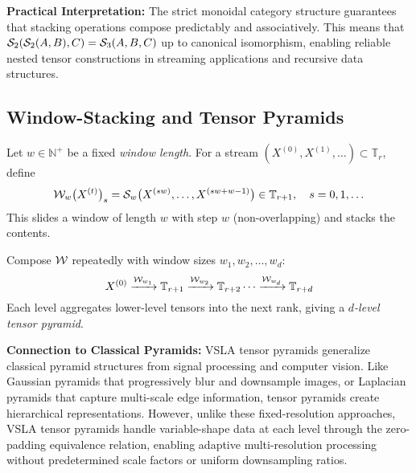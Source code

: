 \textbf{Practical Interpretation:} The strict monoidal category structure guarantees that stacking operations compose predictably and associatively. This means that $\mathcal{S}_2(\mathcal{S}_2(A,B),C) = \mathcal{S}_3(A,B,C)$ up to canonical isomorphism, enabling reliable nested tensor constructions in streaming applications and recursive data structures.

\subsection{Window-Stacking and Tensor Pyramids}

\begin{definition}
Let $w \in \mathbb{N}^+$ be a fixed \emph{window length}. For a stream $(X^{(0)}, X^{(1)}, \ldots) \subset \mathbb{T}_r$, define
\[
\mathcal{W}_w\bigl(X^{(t)}\bigr)_s = \mathcal{S}_w\bigl(X^{(sw)}, \ldots, X^{(sw+w-1)}\bigr) \in \mathbb{T}_{r+1}, \quad s = 0, 1, \ldots
\]
This slides a window of length $w$ with step $w$ (non-overlapping) and stacks the contents.
\end{definition}

\begin{definition}
Compose $\mathcal{W}$ repeatedly with window sizes $w_1, w_2, \ldots, w_d$:
\[
X^{(0)} \xrightarrow{\mathcal{W}_{w_1}} \mathbb{T}_{r+1} \xrightarrow{\mathcal{W}_{w_2}} \mathbb{T}_{r+2} \cdots \xrightarrow{\mathcal{W}_{w_d}} \mathbb{T}_{r+d}
\]
Each level aggregates lower-level tensors into the next rank, giving a \emph{$d$-level tensor pyramid}.
\end{definition}

\textbf{Connection to Classical Pyramids:} VSLA tensor pyramids generalize classical pyramid structures from signal processing and computer vision. Like Gaussian pyramids that progressively blur and downsample images, or Laplacian pyramids that capture multi-scale edge information, tensor pyramids create hierarchical representations. However, unlike these fixed-resolution approaches, VSLA tensor pyramids handle variable-shape data at each level through the zero-padding equivalence relation, enabling adaptive multi-resolution processing without predetermined scale factors or uniform downsampling ratios.

